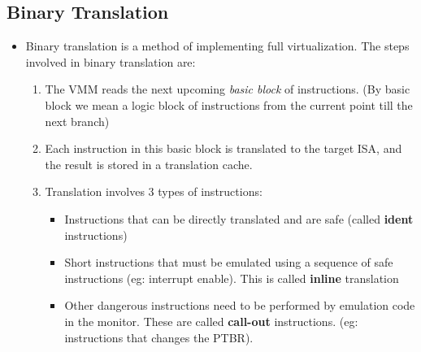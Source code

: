 \documentclass{article}
\begin{document}
\subsection{Binary Translation}
\begin{itemize}
    \item Binary translation is a method of implementing full virtualization. The steps involved in binary translation are:
    
    \begin{enumerate}
        \item The VMM reads the next upcoming \textit{basic block} of instructions. (By basic block we mean a logic block of instructions from the current point till the next branch)
        
        \item Each instruction in this basic block is translated to the target ISA, and the result is stored in a translation cache.
        
        \item Translation involves 3 types of instructions:
        \begin{itemize}
            \item Instructions that can be directly translated and are safe (called \textbf{ident} instructions)
            
            \item Short instructions that must be emulated using a sequence of safe instructions (eg: interrupt enable). This is called \textbf{inline} translation
            
            \item Other dangerous instructions need to be performed by emulation code in the monitor. These are called \textbf{call-out} instructions. (eg: instructions that changes the PTBR).
        \end{itemize}
    \end{enumerate}
\end{itemize}
\end{document}
